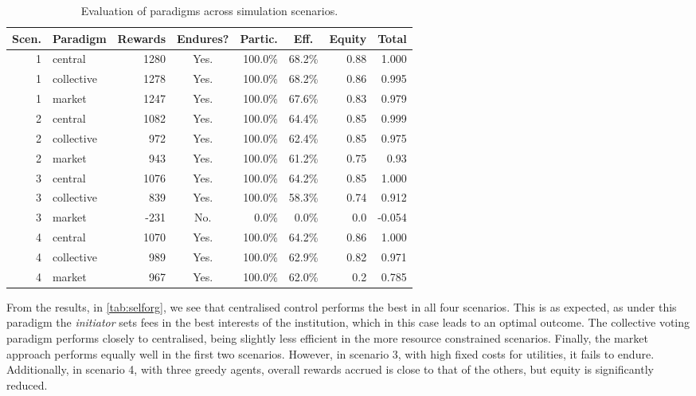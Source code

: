 \begin{table}
\centering
\caption[Evaluation of paradigms across simulation scenarios.]{Evaluation of paradigms across simulation scenarios.}\label{tab:selforg}
\begin{tabular}{rl|rcrrr|r}
\multicolumn{1}{c}{Scen.} & Paradigm & \multicolumn{1}{c}{Rewards} & \multicolumn{1}{c}{Endures?} & \multicolumn{1}{c}{Partic.} & \multicolumn{1}{c}{Eff.} & Equity & \multicolumn{1}{c}{Total} \\
\hline \hline
1 & central & 1280 & Yes. & 100.0\% & 68.2\% & 0.88 & 1.000 \\
1 & collective & 1278 & Yes. & 100.0\% & 68.2\% & 0.86 & 0.995 \\
1 & market & 1247 & Yes. & 100.0\% & 67.6\% & 0.83 & 0.979 \\
\hline
2 & central & 1082 & Yes. & 100.0\% & 64.4\% & 0.85 & 0.999 \\
2 & collective & 972 & Yes. & 100.0\% & 62.4\% & 0.85 & 0.975 \\
2 & market & 943 & Yes. & 100.0\% & 61.2\% & 0.75 & 0.93 \\
\hline
3 & central & 1076 & Yes. & 100.0\% & 64.2\% & 0.85 & 1.000 \\
3 & collective & 839 & Yes. & 100.0\% & 58.3\% & 0.74 & 0.912 \\
3 & market & -231 & No. & 0.0\% & 0.0\% & 0.0 & -0.054 \\
\hline
4 & central & 1070 & Yes. & 100.0\% & 64.2\% & 0.86 & 1.000 \\
4 & collective & 989 & Yes. & 100.0\% & 62.9\% & 0.82 & 0.971 \\
4 & market & 967 & Yes. & 100.0\% & 62.0\% & 0.2 & 0.785 \\
\end{tabular}
\end{table}

From the results, in \autoref{tab:selforg}, we see that centralised control
performs the best in all four scenarios. This is as expected, as under this
paradigm the \emph{initiator} sets fees in the best interests of the institution,
which in this case leads to an optimal outcome. The collective voting paradigm
performs closely to centralised, being slightly less efficient in the more
resource constrained scenarios. Finally, the market approach performs equally
well in the first two scenarios. However, in scenario 3, with high fixed costs
for utilities, it fails to endure. Additionally, in scenario 4, with three
greedy agents, overall rewards accrued is close to that of the others,
but equity is significantly reduced.

